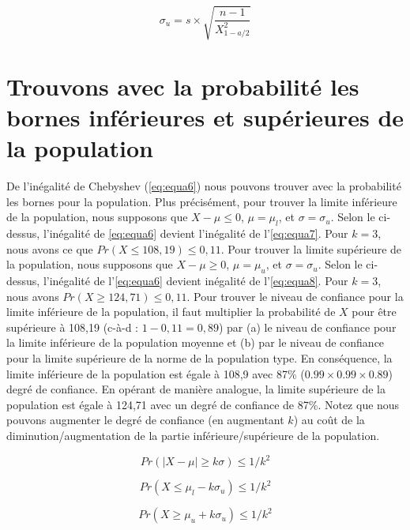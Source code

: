 \begin{equation}\label{eq:equa5}
 \sigma_u = s \times \sqrt{\frac{n-1}{X_{1-a/2}^2}}
\end{equation}

\section{Trouvons avec la probabilité les bornes inférieures et supérieures de la population}
De l'inégalité de Chebyshev (\ref{eq:equa6}) nous pouvons trouver avec la probabilité les bornes pour la population. Plus précisément, pour trouver la limite inférieure de la population, nous supposons que $X-\mu \leq 0$,  $\mu=\mu_l$, et $\sigma = \sigma_u$. Selon le ci-dessus, l'inégalité de \ref{eq:equa6} devient l'inégalité de l'\ref{eq:equa7}. Pour $k = 3$, nous avons ce que $Pr (X \leq 108,19) \leq 0,11$. Pour trouver la limite supérieure de la population, nous supposons que $X-\mu \geq 0$, $\mu = \mu_u$, et $ \sigma = \sigma_u$. Selon le ci-dessus, l'inégalité de l'\ref{eq:equa6} devient inégalité de l'\ref{eq:equa8}. Pour $k = 3$, nous avons $Pr(X \geq 124,71) \leq 0,11$. Pour trouver le niveau de confiance pour la limite inférieure de la population, il faut multiplier la probabilité de $X$ pour être supérieure à 108,19 (c-à-d : $1-0,11 = 0,89 $) par (a) le niveau de confiance pour la limite inférieure de la population moyenne et (b) par le niveau de confiance pour la limite supérieure de la norme de la population type. En conséquence, la limite inférieure de la population est égale à 108,9 avec 87\% ($0.99\times0.99\times0.89$) degré de confiance. En opérant de manière analogue, la limite supérieure de la population est égale à 124,71 avec un degré de confiance de 87\%. Notez que nous pouvons augmenter le degré de confiance (en augmentant $k$) au coût de la diminution/augmentation de la partie inférieure/supérieure de la population.

\begin{equation}\label{eq:equa6}
 Pr( |X-\mu| \geq k \sigma ) \leq 1/k^2
\end{equation}

\begin{equation}\label{eq:equa7}
 Pr( X \leq \mu_l - k \sigma_u ) \leq 1/k^2
\end{equation}

\begin{equation}\label{eq:equa8}
 Pr( X \geq \mu_u + k \sigma_u ) \leq 1/k^2
\end{equation}
